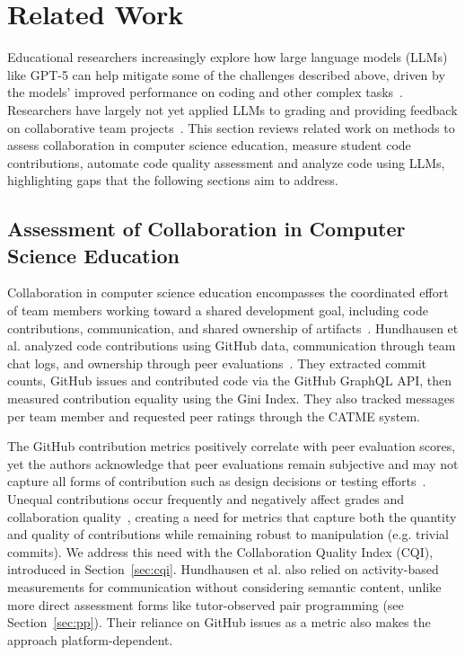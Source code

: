 \documentclass[sigconf]{acmart}
\begin{document}
\section{Related Work}
Educational researchers increasingly explore how large language models (LLMs) like GPT-5 can help mitigate some of the challenges described above, driven by the models' improved performance on coding and other complex tasks~\cite{singh2025openaigpt5card}. Researchers have largely not yet applied LLMs to grading and providing feedback on collaborative team projects~\cite{kasneci2023llmsinedu}. This section reviews related work on methods to assess collaboration in computer science education, measure student code contributions, automate code quality assessment and analyze code using LLMs, highlighting gaps that the following sections aim to address.

\subsection{Assessment of Collaboration in Computer Science Education}
Collaboration in computer science education encompasses the coordinated effort of team members working toward a shared development goal, including code contributions, communication, and shared ownership of artifacts~\cite{ferrao2025llm}. Hundhausen et al. analyzed code contributions using GitHub data, communication through team chat logs, and ownership through peer evaluations~\cite{hundhausen2023combining}. They extracted commit counts, GitHub issues and contributed code via the GitHub GraphQL API, then measured contribution equality using the Gini Index. They also tracked messages per team member and requested peer ratings through the CATME system.

The GitHub contribution metrics positively correlate with peer evaluation scores, yet the authors acknowledge that peer evaluations remain subjective and may not capture all forms of contribution such as design decisions or testing efforts~\cite{hundhausen2023combining}. Unequal contributions occur frequently and negatively affect grades and collaboration quality~\cite{kopec2023impact}, creating a need for metrics that capture both the quantity and quality of contributions while remaining robust to manipulation (e.g. trivial commits). We address this need with the Collaboration Quality Index (CQI), introduced in Section~\ref{sec:cqi}. Hundhausen et al. also relied on activity-based measurements for communication without considering semantic content, unlike more direct assessment forms like tutor-observed pair programming (see Section~\ref{sec:pp}). Their reliance on GitHub issues as a metric also makes the approach platform-dependent.
\end{document}
